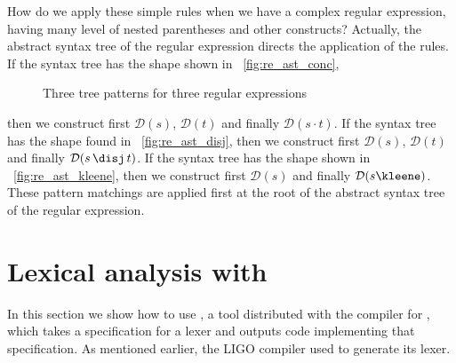 \documentclass[12pt,a4paper]{article}
\begin{document}
How do we apply these simple rules when we have a complex regular
expression, having many level of nested parentheses and other
constructs? Actually, the abstract syntax tree of the regular
expression directs the application of the rules. If the syntax tree
has the shape shown in \fig~\vref{fig:re_ast_conc},
\begin{figure}[b]
\centering
{}
\qquad
{}
\qquad
{}
\caption{Three tree patterns for three regular expressions}
\end{figure}
then we construct first \(\mathcal{D}(s)\), \(\mathcal{D}(t)\) and
finally \(\mathcal{D}(s \cdot t)\). If the syntax tree has the shape
found in \fig~\vref{fig:re_ast_disj}, then we construct first
\(\mathcal{D}(s)\), \(\mathcal{D}(t)\) and finally \(\mathcal{D} (s
\, \text{\disj} \, t)\). If the syntax tree has the shape shown in
\fig~\vref{fig:re_ast_kleene}, then we construct first \({\mathcal
  D}(s)\) and finally \(\mathcal{D}(s\text{\kleene})\). These pattern
matchings are applied first at the root of the abstract syntax tree of
the regular expression.

\section{Lexical analysis with \ocamllex}

In this section we show how to use \ocamllex, a tool distributed with
the compiler for \OCaml, which takes a specification for a lexer and
outputs \OCaml code implementing that specification. As mentioned
earlier, the LIGO compiler used \ocamllex to generate its lexer.
\end{document}
